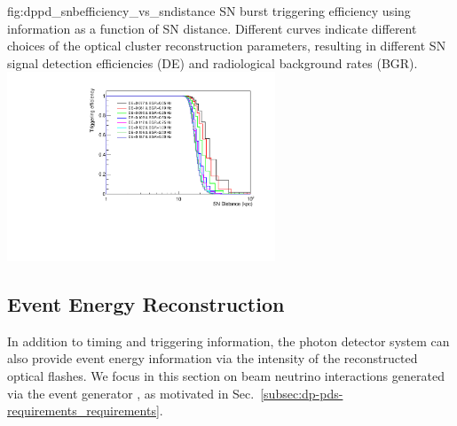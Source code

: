 \begin{dunefigure}{fig:dppd_snbefficiency_vs_sndistance}
     {SN burst triggering efficiency using   information as a function of SN distance. Different curves indicate different choices of the optical cluster reconstruction parameters, resulting in different SN \nue signal detection efficiencies (DE) and radiological background rates (BGR).}
    \includegraphics[width=0.6\textwidth]{graphics/dppd_snbefficiency_vs_sndistance.pdf}
    \end{dunefigure}



\subsection{Event Energy Reconstruction}
\label{subsec:dp-pds-performance_calorimetry}

In addition to timing and triggering information, the photon detector system can also provide event energy information via the intensity of the reconstructed optical flashes. We focus in this section on beam neutrino interactions generated via the  event generator \cite{Andreopoulos:2009rq}, as motivated in Sec.~\ref{subsec:dp-pds-requirements_requirements}.

